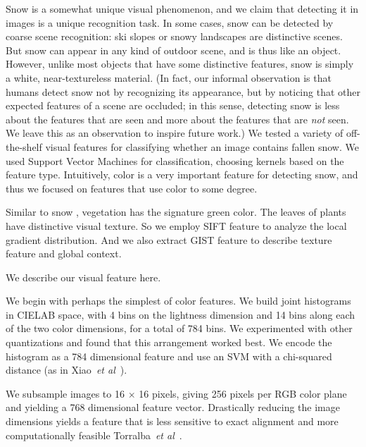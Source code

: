 Snow is a somewhat unique visual phenomenon, and we claim that
detecting it in images is a unique recognition task. In some cases,
snow can be detected by coarse scene recognition: ski slopes or snowy
landscapes are distinctive scenes. But snow can appear in any kind of
outdoor scene, and is thus like an object. However, unlike most
objects that have some distinctive features, snow is simply a white,
near-textureless material.  (In fact, our informal observation is that
humans detect snow not by recognizing its appearance, but by noticing
that other expected features of a scene are occluded; in this sense,
detecting snow is less about the features that are seen and more about
the features that are \textit{not} seen. We leave this as an
observation to inspire future work.)
%
We tested a variety of off-the-shelf visual features for classifying
whether an image contains fallen snow. We used Support Vector
Machines for classification, choosing kernels based on the feature
type.  Intuitively, color is a very important feature for detecting
snow, and thus we focused on features that use color to some
degree.  

Similar to snow , vegetation  has the signature green color. 
The leaves of plants have distinctive visual texture. 
So we employ SIFT feature to analyze the local gradient distribution. 
And we also extract GIST feature to describe texture feature and global context. 

We describe our visual feature here.


 We begin with perhaps the simplest of color
features. We build joint histograms in CIELAB space, with 4 bins on
the lightness dimension and 14 bins along each of the two color
dimensions, for a total of 784 bins. We experimented with other
quantizations and found that this arrangement worked best.  We encode
the histogram as a 784 dimensional feature and use an SVM with a
chi-squared distance (as in Xiao~\textit{et al}~\cite{XiaoHEOT10}).

We subsample images to 16 $\times$ 16 pixels, giving 256 pixels per
RGB color plane and yielding a 768 dimensional feature vector.
Drastically reducing the image dimensions yields a feature that is
less sensitive to exact alignment and more computationally
feasible Torralba~\textit{et al}~\cite{torralba2008tiny}.  


